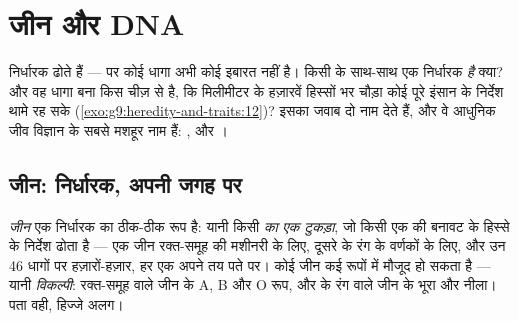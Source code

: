 \chapter{जीन और DNA}\label{ch:g9:genes-and-dna}

 निर्धारक ढोते हैं --- पर कोई धागा अभी कोई इबारत नहीं है। किसी
 के साथ-साथ एक निर्धारक \emph{है} क्या? और वह धागा बना किस चीज़
से है, कि मिलीमीटर के हज़ारवें हिस्सों भर चौड़ा कोई  पूरे इंसान के
निर्देश थामे रह सके (\cref{exo:g9:heredity-and-traits:12})? इसका जवाब
दो नाम देते हैं, और वे आधुनिक जीव विज्ञान के सबसे मशहूर नाम हैं: , और
।

\section{जीन: निर्धारक, अपनी जगह पर}

\begin{definition}[जीन और विकल्पी]\label{def:g9:genes-and-dna:gene}
\emph{जीन} एक निर्धारक का ठीक-ठीक रूप है: यानी किसी
\emph{ का एक टुकड़ा}, जो किसी एक  की बनावट के हिस्से के
निर्देश ढोता है --- एक जीन रक्त-समूह की मशीनरी के लिए, दूसरे  के
रंग के वर्णकों के लिए, और उन 46 धागों पर हज़ारों-हज़ार, हर एक अपने तय पते
पर। कोई जीन कई रूपों में मौजूद हो सकता है --- यानी
\emph{विकल्पी}: रक्त-समूह वाले जीन के A, B और O रूप, और
 के रंग वाले जीन के भूरा और नीला। पता वही, हिज्जे अलग।
\end{definition}

